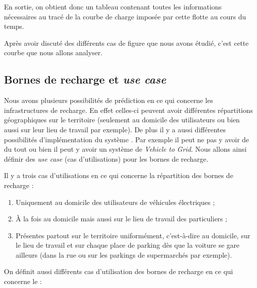 			En sortie, on obtient donc un tableau contenant toutes les informations nécessaires au tracé de la courbe de charge imposée par cette flotte au cours du temps.
			
			Après avoir discuté des différents cas de figure que nous avons étudié, c'est cette courbe que nous allons analyser.
			
		
		
		\clearpage
		\subsection{  Bornes de recharge et \emph{use case} } \label{sec.useCases}
		
		Nous avons plusieurs possibilités de prédiction en ce qui concerne les infrastructures de recharge. En effet celles-ci peuvent avoir différentes répartitions géographiques sur le territoire (seulement au domicile des utilisateurs ou bien aussi sur leur lieu de travail par exemple).
		De plus il y a aussi différentes possibilités d'implémentation du système \smartgrid{}. Par exemple il peut ne pas y avoir de \smartgrid{} du tout ou bien il peut y avoir un système de \emph{Vehicle to Grid}.
		Nous allons ainsi définir des \textit{use case} (cas d'utilisations) pour les bornes de recharge. 
		
		Il y a trois cas d'utilisations en ce qui concerne la répartition des bornes de recharge :
		
		\begin{enumerate}
			\item Uniquement au domicile des utilisateurs de véhicules électriques ;
			\item À la fois au domicile mais aussi sur le lieu de travail des particuliers ;
			\item Présentes partout sur le territoire uniformément, c'est-à-dire au domicile, sur le lieu de  travail et sur chaque place de parking dès que la voiture se gare ailleurs (dans la rue ou sur les parkings de supermarchés par exemple).
		\end{enumerate}
		
		\bigskip
		
		On définit aussi différents cas d'utilisation des bornes de recharge en ce qui concerne le \smartgrid{} :
		
